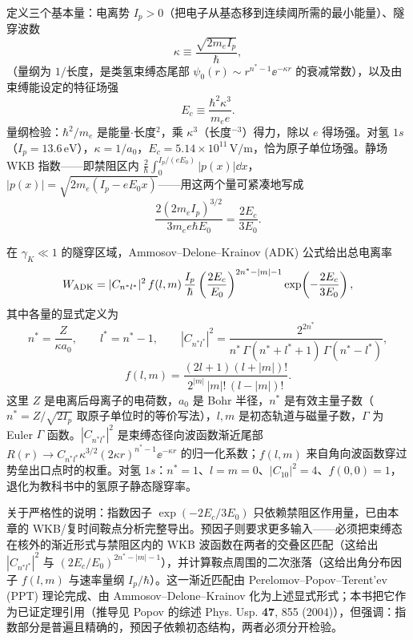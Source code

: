 定义三个基本量：电离势 $I_p>0$（把电子从基态移到连续阈所需的最小能量）、隧穿波数
\begin{equation}
\kappa\equiv\frac{\sqrt{2m_eI_p}}{\hbar},
\label{eq:adk-kappa}
\end{equation}
（量纲为 $1/$长度，是类氢束缚态尾部 $\psi_0(r)\sim r^{n^*-1}\ee^{-\kappa r}$ 的衰减常数），以及由束缚能设定的特征场强
\begin{equation}
E_c\equiv\frac{\hbar^2\kappa^3}{m_e e}.
\label{eq:adk-critical-field}
\end{equation}
量纲检验：$\hbar^2/m_e$ 是能量$\cdot$长度$^2$，乘 $\kappa^3$（长度$^{-3}$）得力，除以 $e$ 得场强。对氢 $1s$（$I_p=13.6\,\mathrm{eV}$），$\kappa=1/a_0$，$E_c=5.14\times10^{11}\,\mathrm{V/m}$，恰为原子单位场强。静场 WKB 指数——即禁阻区内 $\frac{2}{\hbar}\int_0^{I_p/(eE_0)}|p(x)|\dd x$，$|p(x)|=\sqrt{2m_e(I_p-eE_0x)}$——用这两个量可紧凑地写成
\[
\frac{2(2m_eI_p)^{3/2}}{3m_e e\hbar E_0}=\frac{2E_c}{3E_0}.
\]

在 \(\gamma_K\ll1\) 的隧穿区域，Ammosov--Delone--Krainov (ADK) 公式给出总电离率
\begin{equation}
W_{\rm ADK}=|C_{n^*l^*}|^2\,f(l,m)\,\frac{I_p}{\hbar}
\left(\frac{2E_c}{E_0}\right)^{2n^*-|m|-1}
\exp\!\left(-\frac{2E_c}{3E_0}\right),
\label{eq:adk-rate}
\end{equation}
其中各量的显式定义为
\[
n^*=\frac{Z}{\kappa a_0},
\qquad
l^*=n^*-1,
\qquad
|C_{n^*l^*}|^2=\frac{2^{2n^*}}{n^*\,\Gamma(n^*+l^*+1)\,\Gamma(n^*-l^*)},
\]
\[
f(l,m)=\frac{(2l+1)(l+|m|)!}{2^{|m|}\,|m|!\,(l-|m|)!}.
\]
这里 $Z$ 是电离后母离子的电荷数，$a_0$ 是 Bohr 半径，$n^*$ 是有效主量子数（$n^*=Z/\sqrt{2I_p}$ 取原子单位时的等价写法），$l,m$ 是初态轨道与磁量子数，$\Gamma$ 为 Euler $\Gamma$ 函数。$|C_{n^*l^*}|^2$ 是束缚态径向波函数渐近尾部 $R(r)\to C_{n^*l^*}\kappa^{3/2}(2\kappa r)^{n^*-1}\ee^{-\kappa r}$ 的归一化系数；$f(l,m)$ 来自角向波函数穿过势垒出口点时的权重。对氢 $1s$：$n^*=1$、$l=m=0$、$|C_{10}|^2=4$、$f(0,0)=1$，退化为教科书中的氢原子静态隧穿率。

关于严格性的说明：指数因子 $\exp(-2E_c/3E_0)$ 只依赖禁阻区作用量，已由本章的 WKB/复时间鞍点分析完整导出。预因子则要求更多输入——必须把束缚态在核外的渐近形式与禁阻区内的 WKB 波函数在两者的交叠区匹配（这给出 $|C_{n^*l^*}|^2$ 与 $(2E_c/E_0)^{2n^*-|m|-1}$），并计算鞍点周围的二次涨落（这给出角分布因子 $f(l,m)$ 与速率量纲 $I_p/\hbar$）。这一渐近匹配由 Perelomov--Popov--Terent'ev (PPT) 理论完成、由 Ammosov--Delone--Krainov 化为上述显式形式；本书把它作为已证定理引用（推导见 Popov 的综述 Phys. Usp. \textbf{47}, 855 (2004)），但强调：指数部分是普遍且精确的，预因子依赖初态结构，两者必须分开检验。

